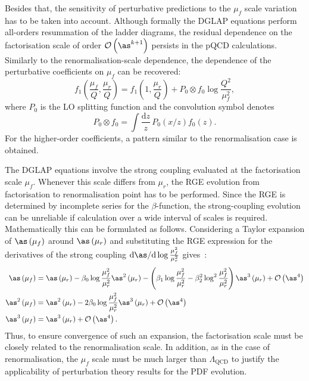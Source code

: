 Besides that, the sensitivity of perturbative predictions to the $\mu_f$ scale variation has to be taken into account. Although formally the DGLAP equations perform all-orders resummation of the ladder diagrams, the residual dependence on the factorisation scale of order $\mathcal{O}\left(\as^{k+1}\right)$ persists in the pQCD calculations. Similarly to the renormalisation-scale dependence, the dependence of the perturbative coefficients on $\mu_f$ can be recovered:
\begin{equation}
 f_1\left(\frac{\mu_f}{Q},\frac{\mu_r}{Q}\right) = f_1\left(1,\frac{\mu_r}{Q}\right) + P_0 \otimes f_0 \log{\frac{Q^2}{\mu_f^2}},
\label{eq:factorisationscaledep}
\end{equation}
where $P_0$ is the LO splitting function and the convolution symbol denotes
\begin{equation}
P_0 \otimes f_0 = \int{\frac{\mathrm{d}z}{z}\,P_0\left(x/z\right)f_0\left(z\right)}.
\end{equation}
For the higher-order coefficients, a pattern similar to the renormalisation case is obtained.

The DGLAP equations involve the strong coupling evaluated at the factorisation scale $\mu_f$. Whenever this scale differs from $\mu_r$, the RGE evolution from factorisation to renormalisation point has to be performed. Since the RGE is determined by incomplete series for the $\beta$-function, the strong-coupling evolution can be unreliable if calculation over a wide interval of scales is required. Mathematically this can be formulated as follows. Considering a Taylor expansion of $\as\left(\mu_f\right)$ around $\as\left(\mu_r\right)$ and substituting the RGE expression for the derivatives of the strong coupling $\mathrm{d}\as/\mathrm{d}\log{\frac{\mu_f^2}{\mu_r^2}}$ gives~\cite{Botje:2010ay}:
{\small
\begin{align}
 \as\left(\mu_f\right) &= \as\left(\mu_r\right) - \beta_0\log{\frac{\mu_f^2}{\mu_r^2}}\as^2\left(\mu_r\right) - \left(\beta_1\log{\frac{\mu_f^2}{\mu_r^2}} - \beta_2^2\log^2{\frac{\mu_f^2}{\mu_r^2}}\right)\as^3\left(\mu_r\right) + \mathcal{O}\left(\as^4\right)\\ \nonumber
 \as^2\left(\mu_f\right) & = \as^2\left(\mu_r\right) - 2\beta_0\log{\frac{\mu_f^2}{\mu_r^2}}\as^3\left(\mu_r\right) + \mathcal{O}\left(\as^4\right)\\
\as^3\left(\mu_f\right) & = \as^3\left(\mu_r\right) + \mathcal{O}\left(\as^4\right).
\end{align}
}
Thus, to ensure convergence of such an expansion, the factorisation scale must be closely related to the renormalisation scale. In addition, as in the case of renormalisation, the $\mu_f$ scale must be much larger than $\Lambda_\mathrm{QCD}$ to justify the applicability of perturbation theory results for the PDF evolution.

